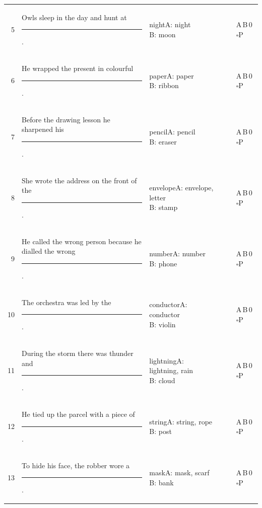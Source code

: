 \documentclass[10pt,a4paper]{article}
\newcommand{\blank}[1][1.2cm]{\rule{#1}{0.4pt}}
\newcommand{\bx}{$\square$}
\begin{document}
{\begin{longtable}{@{}r>{\raggedright\arraybackslash}p{7.2cm}>{\raggedright\arraybackslash}p{1.9cm}p{2.4cm}p{1.1cm}l@{}}
5 & Owls sleep in the day and hunt at \rule{1.1cm}{0.4pt}. & night\newline{\scriptsize A: night\newline B: moon} & \blank[2.2cm] & \blank[0.9cm] & A\,B\,0 \bx P\\
6 & He wrapped the present in colourful \rule{1.1cm}{0.4pt}. & paper\newline{\scriptsize A: paper\newline B: ribbon} & \blank[2.2cm] & \blank[0.9cm] & A\,B\,0 \bx P\\
7 & Before the drawing lesson he sharpened his \rule{1.1cm}{0.4pt}. & pencil\newline{\scriptsize A: pencil\newline B: eraser} & \blank[2.2cm] & \blank[0.9cm] & A\,B\,0 \bx P\\
8 & She wrote the address on the front of the \rule{1.1cm}{0.4pt}. & envelope\newline{\scriptsize A: envelope, letter\newline B: stamp} & \blank[2.2cm] & \blank[0.9cm] & A\,B\,0 \bx P\\
9 & He called the wrong person because he dialled the wrong \rule{1.1cm}{0.4pt}. & number\newline{\scriptsize A: number\newline B: phone} & \blank[2.2cm] & \blank[0.9cm] & A\,B\,0 \bx P\\
10 & The orchestra was led by the \rule{1.1cm}{0.4pt}. & conductor\newline{\scriptsize A: conductor\newline B: violin} & \blank[2.2cm] & \blank[0.9cm] & A\,B\,0 \bx P\\
11 & During the storm there was thunder and \rule{1.1cm}{0.4pt}. & lightning\newline{\scriptsize A: lightning, rain\newline B: cloud} & \blank[2.2cm] & \blank[0.9cm] & A\,B\,0 \bx P\\
12 & He tied up the parcel with a piece of \rule{1.1cm}{0.4pt}. & string\newline{\scriptsize A: string, rope\newline B: post} & \blank[2.2cm] & \blank[0.9cm] & A\,B\,0 \bx P\\
13 & To hide his face, the robber wore a \rule{1.1cm}{0.4pt}. & mask\newline{\scriptsize A: mask, scarf\newline B: bank} & \blank[2.2cm] & \blank[0.9cm] & A\,B\,0 \bx P\\

\end{longtable}}
\end{document}
